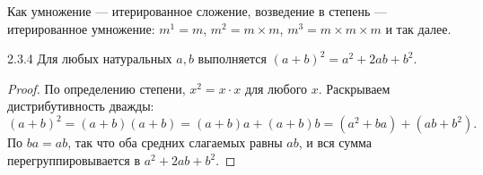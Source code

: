 \begin{remark}
Как умножение — итерированное сложение, возведение в степень — итерированное умножение:
$m^1=m$, $m^2=m \times m$, $m^3=m \times m \times m$ и так далее.
\end{remark}

\begin{exercise}{2.3.4}{}
Для любых натуральных $a,b$ выполняется $(a+b)^2 = a^2+2ab+b^2$.
\end{exercise}

\begin{proof}
По определению степени, $x^2 = x{\cdot}x$ для любого $x$. Раскрываем дистрибутивность
дважды:
\[
  (a+b)^2 = (a+b)(a+b) = (a+b)a + (a+b)b = (a^2+ba) + (ab+b^2).
\]
По  $ba=ab$, так что оба средних слагаемых равны $ab$,
и вся сумма перегруппировывается в $a^2 + 2ab + b^2$.
\end{proof}
